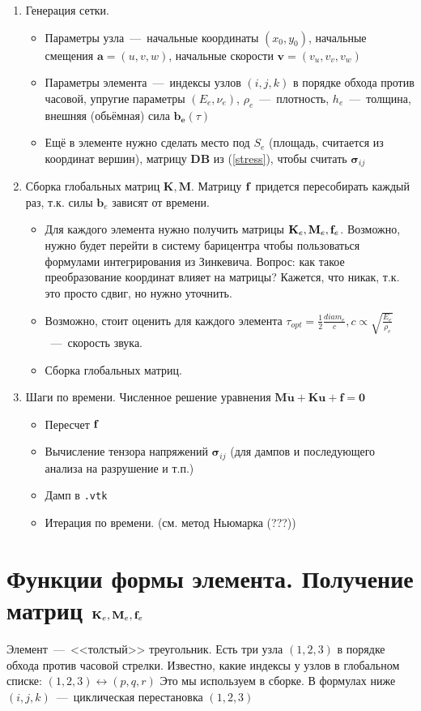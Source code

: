 \documentclass[12pt,a4paper,fleqn]{article}
\begin{document}
	\begin{enumerate}
		\item Генерация сетки.
			\begin{itemize}
				\item Параметры узла~---~начальные координаты $(x_0, y_0)$, начальные смещения $\mathbf{a} = (u, v, w)$,
							начальные скорости $\mathbf{v} = (v_u, v_v, v_w)$
				\item Параметры элемента~---~индексы узлов $(i, j, k)$ в порядке обхода против часовой, 
					упругие параметры $(E_e, \nu_e)$, $\rho_e$~---~плотность, $h_e$~---~толщина, внешняя (обьёмная) сила $\mathbf{b_e}(\tau)$
				\item Ещё в элементе нужно сделать место под $S_e$ (площадь, считается из координат вершин), 
						матрицу $\mathbf{DB}$ из (\ref{stress}), чтобы считать $\mathbf{\sigma}_{ij}$
			\end{itemize}
		\item Сборка глобальных матриц $\mathbf{K, M}$. Матрицу $\mathbf{f}$ придется пересобирать каждый раз, т.к. 
			силы $\mathbf{b}_e$ зависят от времени.
			\begin{itemize}
				\item Для каждого элемента нужно получить матрицы $\mathbf{K}_e, \mathbf{M}_e, \mathbf{f}_e$. Возможно, нужно будет перейти в систему барицентра чтобы пользоваться
					формулами интегрирования из Зинкевича. Вопрос: как такое преобразование координат влияет на матрицы? Кажется, что никак, т.к. это просто сдвиг, 
					но нужно уточнить.
				\item Возможно, стоит оценить для каждого элемента $\tau_{opt} = \frac12 \frac{diam_e}{c}, c \propto \sqrt{\frac{E_e}{\rho_e}}$~---~скорость звука.
				\item Сборка глобальных матриц.
			\end{itemize}
		\item Шаги по времени. Численное решение уравнения $\mathbf{M\ddot{u} + Ku + f} = \mathbf{0}$
			\begin{itemize}
				\item Пересчет $\mathbf{f}$
				\item Вычисление тензора напряжений $\mathbf{\sigma}_{ij}$ (для дампов и последующего анализа на разрушение и т.п.) 
				\item Дамп в \texttt{.vtk}
				\item Итерация по времени. (см. метод Ньюмарка (???))
			\end{itemize}
	\end{enumerate}
\section{Функции формы элемента. Получение матриц $\mathbf{K}_e, \mathbf{M}_e, \mathbf{f}_e$}
		Элемент~---~<<толстый>> треугольник. Есть три узла $(1, 2, 3)$ в порядке обхода против часовой стрелки. Известно, какие индексы у узлов в глобальном списке:
			$(1,2,3) \leftrightarrow (p, q, r)$ Это мы используем в сборке. В формулах ниже $(i, j, k)$~---~циклическая перестановка $(1,2,3)$
\end{document}

